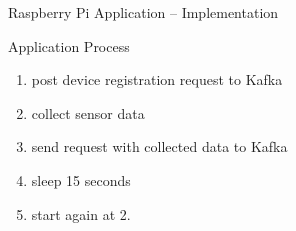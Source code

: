 \begin{frame}{Raspberry Pi Application -- Implementation}
  \begin{block}{Application Process}
    \begin{enumerate}
      \item post device registration request to Kafka
      \item collect sensor data
      \item send request with collected data to Kafka
      \item sleep 15 seconds
      \item start again at 2.
    \end{enumerate}
  \end{block}
\end{frame}
